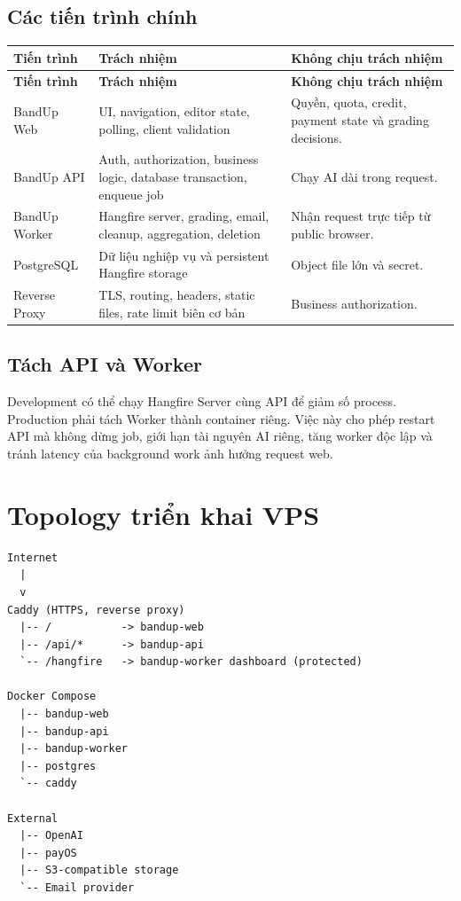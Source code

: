 \documentclass[11pt,a4paper]{article}
\begin{document}
\subsection{Các tiến trình chính}
\begin{longtable}{|P{0.23\textwidth}|P{0.30\textwidth}|P{0.37\textwidth}|}
\hline
\textbf{Tiến trình} & \textbf{Trách nhiệm} & \textbf{Không chịu trách nhiệm} \\ \hline
\endfirsthead
\hline
\textbf{Tiến trình} & \textbf{Trách nhiệm} & \textbf{Không chịu trách nhiệm} \\ \hline
\endhead
BandUp Web & UI, navigation, editor state, polling, client validation & Quyền, quota, credit, payment state và grading decisions. \\ \hline
BandUp API & Auth, authorization, business logic, database transaction, enqueue job & Chạy AI dài trong request. \\ \hline
BandUp Worker & Hangfire server, grading, email, cleanup, aggregation, deletion & Nhận request trực tiếp từ public browser. \\ \hline
PostgreSQL & Dữ liệu nghiệp vụ và persistent Hangfire storage & Object file lớn và secret. \\ \hline
Reverse Proxy & TLS, routing, headers, static files, rate limit biên cơ bản & Business authorization. \\ \hline
\end{longtable}

\subsection{Tách API và Worker}
Development có thể chạy Hangfire Server cùng API để giảm số process. Production phải tách Worker thành container riêng. Việc này cho phép restart API mà không dừng job, giới hạn tài nguyên AI riêng, tăng worker độc lập và tránh latency của background work ảnh hưởng request web.

\section{Topology triển khai VPS}

\begin{architecturebox}
\begin{lstlisting}
Internet
  |
  v
Caddy (HTTPS, reverse proxy)
  |-- /           -> bandup-web
  |-- /api/*      -> bandup-api
  `-- /hangfire   -> bandup-worker dashboard (protected)

Docker Compose
  |-- bandup-web
  |-- bandup-api
  |-- bandup-worker
  |-- postgres
  `-- caddy

External
  |-- OpenAI
  |-- payOS
  |-- S3-compatible storage
  `-- Email provider
\end{lstlisting}
\end{architecturebox}
\end{document}
